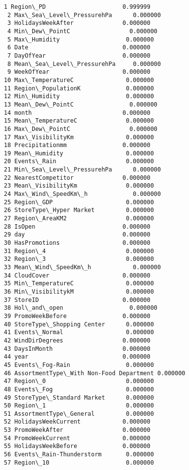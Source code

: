 \documentclass[11pt]{article}
\begin{document}
    \begin{Verbatim}[commandchars=\\\{\}]
 1 Region\_PD                      0.999999
 2 Max\_Sea\_Level\_PressurehPa      0.000000
 3 HolidaysWeekAfter              0.000000
 4 Min\_Dew\_PointC                 0.000000
 5 Max\_Humidity                   0.000000
 6 Date                           0.000000
 7 DayOfYear                      0.000000
 8 Mean\_Sea\_Level\_PressurehPa     0.000000
 9 WeekOfYear                     0.000000
10 Max\_TemperatureC               0.000000
11 Region\_PopulationK             0.000000
12 Min\_Humidity                   0.000000
13 Mean\_Dew\_PointC                0.000000
14 month                          0.000000
15 Mean\_TemperatureC              0.000000
16 Max\_Dew\_PointC                 0.000000
17 Max\_VisibilityKm               0.000000
18 Precipitationmm                0.000000
19 Mean\_Humidity                  0.000000
20 Events\_Rain                    0.000000
21 Min\_Sea\_Level\_PressurehPa      0.000000
22 NearestCompetitor              0.000000
23 Mean\_VisibilityKm              0.000000
24 Max\_Wind\_SpeedKm\_h             0.000000
25 Region\_GDP                     0.000000
26 StoreType\_Hyper Market         0.000000
27 Region\_AreaKM2                 0.000000
28 IsOpen                         0.000000
29 day                            0.000000
30 HasPromotions                  0.000000
31 Region\_4                       0.000000
32 Region\_3                       0.000000
33 Mean\_Wind\_SpeedKm\_h            0.000000
34 CloudCover                     0.000000
35 Min\_TemperatureC               0.000000
36 Min\_VisibilitykM               0.000000
37 StoreID                        0.000000
38 Hol\_and\_open                   0.000000
39 PromoWeekBefore                0.000000
40 StoreType\_Shopping Center      0.000000
41 Events\_Normal                  0.000000
42 WindDirDegrees                 0.000000
43 DaysInMonth                    0.000000
44 year                           0.000000
45 Events\_Fog-Rain                0.000000
46 AssortmentType\_With Non-Food Department 0.000000
47 Region\_0                       0.000000
48 Events\_Fog                     0.000000
49 StoreType\_Standard Market      0.000000
50 Region\_1                       0.000000
51 AssortmentType\_General         0.000000
52 HolidaysWeekCurrent            0.000000
53 PromoWeekAfter                 0.000000
54 PromoWeekCurrent               0.000000
55 HolidaysWeekBefore             0.000000
56 Events\_Rain-Thunderstorm       0.000000
57 Region\_10                      0.000000

\end{Verbatim}
\end{document}
